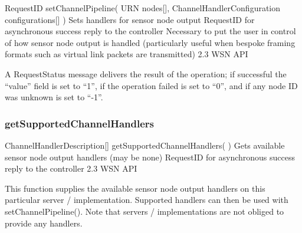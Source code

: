 \begin{apidoc}
	{RequestID setChannelPipeline( URN nodes[], ChannelHandlerConfiguration configurations[] )} %
	{Sets handlers for sensor node output} %
	{
	} %
	{RequestID for asynchronous success reply to the controller} %
	{Necessary to put the user in control of how sensor node output is handled (particularly useful when bespoke framing formats such as virtual link packets are transmitted)} %
	{2.3 WSN API} %
\end{apidoc}

A RequestStatus message delivers the result of the operation; if successful the ``value'' field is set to ``1'', if the operation failed is set to ``0'', and if any node ID was unknown is set to ``-1''.

			\subsubsection{getSupportedChannelHandlers}


\begin{apidoc}
	{ChannelHandlerDescription[] getSupportedChannelHandlers( )} %
	{Gets available sensor node output handlers (may be none)} %
	{
			\apiparameters{
			}
	} %
	{RequestID for asynchronous success reply to the controller} %
	{} %
	{2.3 WSN API} %
\end{apidoc}

This function supplies the available sensor node output handlers on this particular server / implementation. Supported handlers can then be used with setChannelPipeline(). Note that servers / implementations are not obliged to provide any handlers.